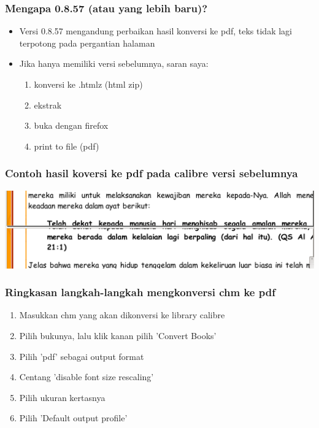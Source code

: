 \documentclass[11pt]{beamer}
\begin{document}
\begin{frame}
\frametitle{Mengapa 0.8.57 (atau yang lebih baru)?}
\begin{itemize}
\item Versi 0.8.57 mengandung perbaikan hasil konversi ke pdf, teks tidak lagi terpotong pada pergantian halaman 
\item Jika hanya memiliki versi sebelumnya, saran saya:
\begin{enumerate}
\item konversi ke .htmlz (html zip)
\item ekstrak
\item buka dengan firefox
\item print to file (pdf) 
\end{enumerate}
\end{itemize}       
\end{frame}


\begin{frame}[shrink=20]
\frametitle{Contoh hasil koversi ke pdf pada calibre versi sebelumnya}
\includegraphics[width=\paperwidth]{graphic/prev_version.png}
\end{frame}

\begin{frame}
\frametitle{Ringkasan langkah-langkah mengkonversi chm ke pdf}
\begin{enumerate}
\item Masukkan chm yang akan dikonversi ke library calibre
\item Pilih bukunya, lalu klik kanan pilih 'Convert Books'
\item Pilih 'pdf' sebagai output format 
\item Centang 'disable font size rescaling'
\item Pilih ukuran kertasnya
\item Pilih 'Default output profile'
\end{enumerate}      
\end{frame}
\end{document}
